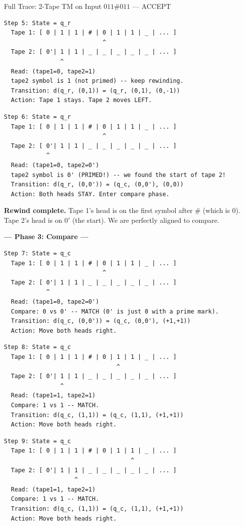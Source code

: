 \begin{examplebox}{{Full Trace: 2-Tape TM on Input $011\#011$ --- ACCEPT}}
\begin{lstlisting}
Step 5: State = q_r
  Tape 1: [ 0 | 1 | 1 | # | 0 | 1 | 1 | _ | ... ]
                            ^
  Tape 2: [ 0'| 1 | 1 | _ | _ | _ | _ | _ | ... ]
                ^
  Read: (tape1=0, tape2=1)
  tape2 symbol is 1 (not primed) -- keep rewinding.
  Transition: d(q_r, (0,1)) = (q_r, (0,1), (0,-1))
  Action: Tape 1 stays. Tape 2 moves LEFT.
\end{lstlisting}

\begin{lstlisting}
Step 6: State = q_r
  Tape 1: [ 0 | 1 | 1 | # | 0 | 1 | 1 | _ | ... ]
                            ^
  Tape 2: [ 0'| 1 | 1 | _ | _ | _ | _ | _ | ... ]
            ^
  Read: (tape1=0, tape2=0')
  tape2 symbol is 0' (PRIMED!) -- we found the start of tape 2!
  Transition: d(q_r, (0,0')) = (q_c, (0,0'), (0,0))
  Action: Both heads STAY. Enter compare phase.
\end{lstlisting}

\textbf{Rewind complete.} Tape 1's head is on the first symbol after $\#$ (which is 0). Tape 2's head is on $0'$ (the start). We are perfectly aligned to compare.

\bigskip
\textbf{--- Phase 3: Compare ---}

\begin{lstlisting}
Step 7: State = q_c
  Tape 1: [ 0 | 1 | 1 | # | 0 | 1 | 1 | _ | ... ]
                            ^
  Tape 2: [ 0'| 1 | 1 | _ | _ | _ | _ | _ | ... ]
            ^
  Read: (tape1=0, tape2=0')
  Compare: 0 vs 0' -- MATCH (0' is just 0 with a prime mark).
  Transition: d(q_c, (0,0')) = (q_c, (0,0'), (+1,+1))
  Action: Move both heads right.
\end{lstlisting}

\begin{lstlisting}
Step 8: State = q_c
  Tape 1: [ 0 | 1 | 1 | # | 0 | 1 | 1 | _ | ... ]
                                ^
  Tape 2: [ 0'| 1 | 1 | _ | _ | _ | _ | _ | ... ]
                ^
  Read: (tape1=1, tape2=1)
  Compare: 1 vs 1 -- MATCH.
  Transition: d(q_c, (1,1)) = (q_c, (1,1), (+1,+1))
  Action: Move both heads right.
\end{lstlisting}

\begin{lstlisting}
Step 9: State = q_c
  Tape 1: [ 0 | 1 | 1 | # | 0 | 1 | 1 | _ | ... ]
                                    ^
  Tape 2: [ 0'| 1 | 1 | _ | _ | _ | _ | _ | ... ]
                    ^
  Read: (tape1=1, tape2=1)
  Compare: 1 vs 1 -- MATCH.
  Transition: d(q_c, (1,1)) = (q_c, (1,1), (+1,+1))
  Action: Move both heads right.
\end{lstlisting}


\end{examplebox}
